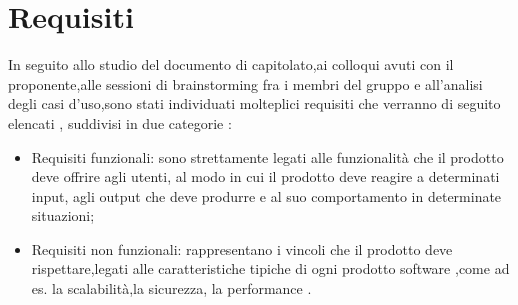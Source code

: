 \section{Requisiti}
In seguito allo studio del documento di capitolato,ai colloqui avuti con il proponente,alle sessioni di
brainstorming fra i membri del gruppo e all'analisi degli casi d'uso,sono stati individuati molteplici requisiti
che verranno di seguito elencati , suddivisi in due categorie :
\begin{itemize}
    \item Requisiti funzionali: sono strettamente legati alle funzionalità che il prodotto deve offrire agli utenti,
    al modo in cui il prodotto deve reagire a determinati input, agli output che deve produrre e al suo comportamento in determinate situazioni;
    \item Requisiti non funzionali: rappresentano i vincoli che il prodotto deve rispettare,legati alle caratteristiche tipiche di
    ogni prodotto software ,come ad es. la scalabilità,la sicurezza, la performance .
\end{itemize}
